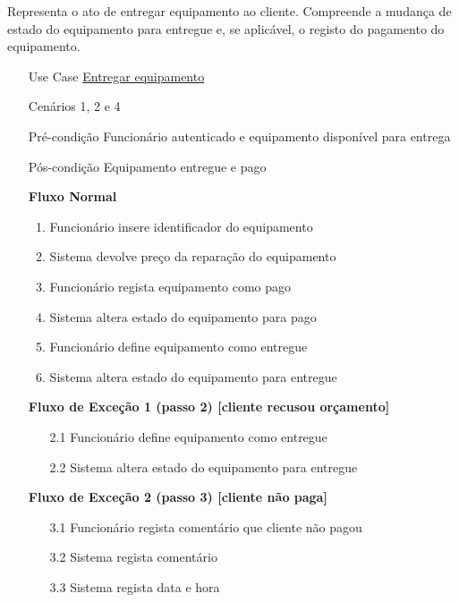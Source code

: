 \documentclass[../relatorio.tex]{subfiles}
\begin{document}
Representa o ato de entregar equipamento ao cliente.
Compreende a mudança de estado do equipamento para entregue
e, se aplicável, o registo do pagamento do equipamento.
\begin{itemize}
    \item[Use Case] {\underline{Entregar equipamento}}
    \item[Cenários] {1, 2 e 4}
    \item[Pré-condição] {Funcionário autenticado e equipamento disponível para entrega}
    \item[Pós-condição] {Equipamento entregue e pago}
          \begin{flushleft}
              \textbf{Fluxo Normal}
          \end{flushleft}
          \begin{enumerate}
              \item Funcionário insere identificador do equipamento
              \item Sistema devolve preço da reparação do equipamento
              \item Funcionário regista equipamento como pago
              \item Sistema altera estado do equipamento para pago
              \item Funcionário define equipamento como entregue
              \item Sistema altera estado do equipamento para entregue
          \end{enumerate}
          \begin{flushleft}
              \textbf{Fluxo de Exceção 1 (passo 2) [cliente recusou orçamento]}
          \end{flushleft}
          \begin{itemize}
              \item[2.1] Funcionário define equipamento como entregue
              \item[2.2] Sistema altera estado do equipamento para entregue
          \end{itemize}
             \begin{flushleft}
                 \textbf{Fluxo de Exceção 2 (passo 3) [cliente não paga]}
             \end{flushleft}
             \begin{itemize}
                 \item[3.1]{Funcionário regista comentário que cliente não pagou}
                 \item[3.2]{Sistema regista comentário}
                 \item[3.3]{Sistema regista data e hora}  
             \end{itemize}
\end{itemize}
\end{document}
